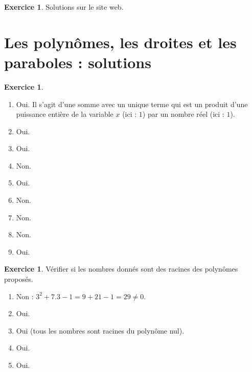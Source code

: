 \documentclass[a4paper,13pt]{scrreprt}
\theoremstyle{plain}
\theoremstyle{definition}
\newtheorem{exo}[subsection]{Exercice}
\begin{document}
\begin{exo}
	Solutions sur le site web.
\end{exo}

\section{Les polynômes, les droites et les paraboles : solutions}

\begin{exo}
	\begin{enumerate} ~~\\
		\item Oui. Il s'agit d'une somme avec un unique terme qui est un produit d'une puissance entière de la variable $x$ (ici : $1$) par un nombre réel (ici : $1$).
		\item Oui.
		\item Oui.
		\item Non.
		\item Oui.
		\item Non.
		\item Non.
		\item Non.
		\item Oui.
	\end{enumerate}
\end{exo}

\begin{exo}
	Vérifier si les nombres donnés sont des racines des polynômes proposés.
	\begin{enumerate}
		\item Non : $3^2 +7.3 -1 = 9 +21 - 1 = 29 \neq 0$.
		\item Oui.
		\item Oui (tous les nombres sont racines du polynôme nul).
		\item Oui.
		\item Oui.
	\end{enumerate}
\end{exo}
\end{document}
